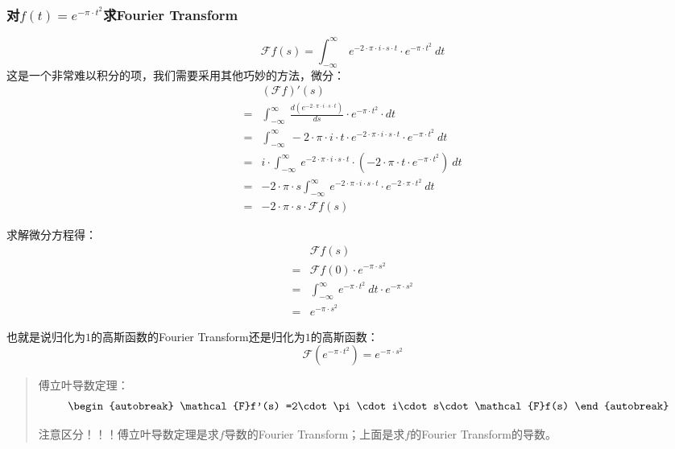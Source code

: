 \subsubsection{对$f(t)=e^{-\pi\cdot t^2}$求Fourier Transform}
$$
	\mathcal{F}f(s)=\int_{-\infty}^{\infty}\ e^{-2\cdot \pi\cdot i\cdot s\cdot t}\cdot e^{-\pi\cdot t^2}\ dt
$$
这是一个非常难以积分的项，我们需要采用其他巧妙的方法，微分：
\begin{align*}
	  & (\mathcal{F}f)'(s)                                                                                                      \\
	= & \int_{-\infty}^{\infty}\ \frac{d(e^{-2\cdot \pi\cdot i\cdot s\cdot t})}{ds}\cdot e^{-\pi\cdot t^2}\cdot dt              \\
	= & \int_{-\infty}^{\infty}\ -2\cdot\pi\cdot i\cdot t\cdot e^{-2\cdot \pi\cdot i\cdot s\cdot t}\cdot e^{-\pi\cdot t^2}\ dt  \\
	= & i\cdot \int_{-\infty}^{\infty}\ e^{-2\cdot \pi\cdot i\cdot s\cdot t}\cdot(-2\cdot\pi\cdot t\cdot e^{-\pi\cdot t^2})\ dt \\
	= & -2\cdot\pi\cdot s \int_{-\infty}^{\infty}\ e^{-2\cdot \pi\cdot i\cdot s\cdot t}\cdot e^{-2\cdot\pi\cdot t^2}\ dt        \\
	= & -2\cdot\pi\cdot s\cdot \mathcal{F}f(s)
\end{align*}

求解微分方程得：
\begin{align*}
	  & \mathcal{F}f(s)                                                       \\
	= & \mathcal{F}f(0)\cdot e^{-\pi\cdot s^2}                                \\
	= & \int_{-\infty}^{\infty}\ e^{-\pi\cdot t^2}\ dt\cdot e^{-\pi\cdot s^2} \\
	= & e^{-\pi\cdot s^2}
\end{align*}

也就是说归化为$1$的高斯函数的Fourier Transform还是归化为$1$的高斯函数：
\begin{equation}
	\mathcal{F}(e^{-\pi\cdot t^2})=e^{-\pi\cdot s^2}
\end{equation}
\begin{quote}
	傅立叶导数定理：
	\begin{align*}
		\begin{autobreak}
			\mathcal{F}f'(s)
			=2\cdot\pi\cdot i\cdot s\cdot \mathcal{F}f(s)
		\end{autobreak}
	\end{align*}

	注意区分！！！傅立叶导数定理是求$f$导数的Fourier Transform；上面是求$f$的Fourier Transform的导数。
\end{quote}

